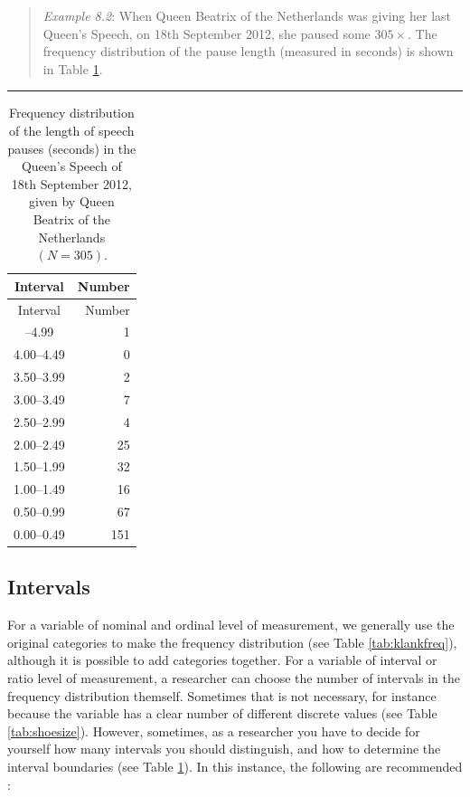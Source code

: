 \documentclass[
]{book}
\begin{document}
\begin{quote}
\emph{Example 8.2}: When Queen Beatrix of the Netherlands was giving her last Queen's Speech,
on 18th September 2012, she paused some \(305\times\). The frequency distribution
of the pause length (measured in seconds) is shown in
Table \ref{tab:queensspeech2012pauses}.
\end{quote}

\begin{center}\rule{0.5\linewidth}{0.5pt}\end{center}

\begin{longtable}[]{@{}cr@{}}
\caption{\label{tab:queensspeech2012pauses} Frequency distribution of the length of speech pauses (seconds)
in the Queen's Speech of 18th September 2012, given by Queen Beatrix of the Netherlands
\((N=305)\).}\tabularnewline
\toprule\noalign{}
Interval & Number \\
\midrule\noalign{}
\endfirsthead
\toprule\noalign{}
Interval & Number \\
\midrule\noalign{}
\endhead
\bottomrule\noalign{}
\endlastfoot
4.50--4.99 & 1 \\
4.00--4.49 & 0 \\
3.50--3.99 & 2 \\
3.00--3.49 & 7 \\
2.50--2.99 & 4 \\
2.00--2.49 & 25 \\
1.50--1.99 & 32 \\
1.00--1.49 & 16 \\
0.50--0.99 & 67 \\
0.00--0.49 & 151 \\
\end{longtable}

\hypertarget{sec:intervals}{%
\subsection{Intervals}\label{sec:intervals}}

For a variable of nominal and ordinal level of measurement, we generally
use the original categories to make the frequency distribution
(see Table \ref{tab:klankfreq}), although it is possible to add categories
together. For a variable of interval or ratio level of measurement, a
researcher can choose the number of intervals in the frequency distribution
themself. Sometimes that is not necessary, for instance because the variable has
a clear number of different discrete values (see Table \ref{tab:shoesize}).
However, sometimes, as a researcher you have to decide for yourself how many
intervals you should distinguish, and how to determine the
interval boundaries (see Table \ref{tab:queensspeech2012pauses}).
In this instance, the following are recommended \citep[Ch.2]{Ferg89}:
\end{document}
